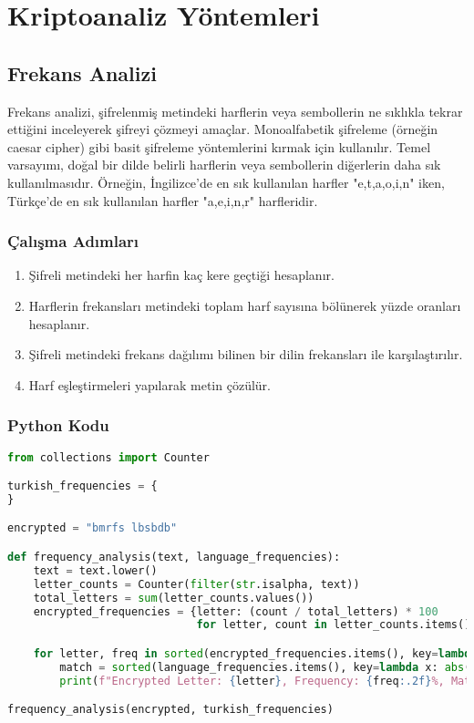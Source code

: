 \section{Kriptoanaliz Yöntemleri}

\subsection{Frekans Analizi}

Frekans analizi, şifrelenmiş metindeki harflerin veya sembollerin ne sıklıkla tekrar ettiğini inceleyerek şifreyi çözmeyi amaçlar. Monoalfabetik şifreleme (örneğin caesar cipher) gibi basit şifreleme yöntemlerini kırmak için kullanılır. Temel varsayımı, doğal bir dilde belirli harflerin veya sembollerin diğerlerin daha sık kullanılmasıdır. Örneğin, İngilizce'de en sık kullanılan harfler "e,t,a,o,i,n" iken, Türkçe'de en sık kullanılan harfler "a,e,i,n,r" harfleridir.

\subsubsection{Çalışma Adımları}

\begin{enumerate}
    \item Şifreli metindeki her harfin kaç kere geçtiği hesaplanır.
    \item Harflerin frekansları metindeki toplam harf sayısına bölünerek yüzde oranları hesaplanır.
    \item Şifreli metindeki frekans dağılımı bilinen bir dilin frekansları ile karşılaştırılır.
    \item Harf eşleştirmeleri yapılarak metin çözülür.
\end{enumerate}

\subsubsection{Python Kodu}

\begin{lstlisting}[language=Python]
from collections import Counter

turkish_frequencies = {
}

encrypted = "bmrfs lbsbdb"

def frequency_analysis(text, language_frequencies):
    text = text.lower()
    letter_counts = Counter(filter(str.isalpha, text))
    total_letters = sum(letter_counts.values())
    encrypted_frequencies = {letter: (count / total_letters) * 100 
                             for letter, count in letter_counts.items()}

    for letter, freq in sorted(encrypted_frequencies.items(), key=lambda x: x[1], reverse=True):
        match = sorted(language_frequencies.items(), key=lambda x: abs(x[1] - freq))[0]
        print(f"Encrypted Letter: {letter}, Frequency: {freq:.2f}%, Matched: {match[0]}")

frequency_analysis(encrypted, turkish_frequencies)
\end{lstlisting}

